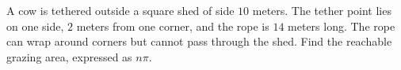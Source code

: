 A cow is tethered outside a square shed of side $10$ meters. The tether point lies on one side, $2$ meters from one corner, and the rope is $14$ meters long. The rope can wrap around corners but cannot pass through the shed. Find the reachable grazing area, expressed as $n\pi$.
